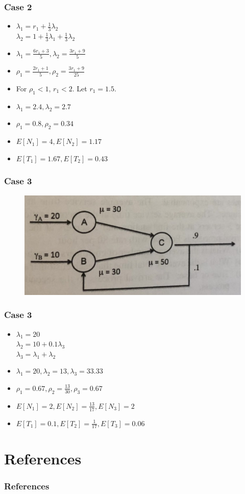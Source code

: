 \documentclass[10pt,notes]{beamer}
\begin{document}
\begin{frame}
    \frametitle{Case 2}
    \begin{itemize}
        \item $\lambda_1 = r_1 + \frac{1}{3}\lambda_2$ \\
            $\lambda_2 = 1 + \frac{1}{3}\lambda_1 + \frac{1}{3}\lambda_2$ \\
        \item $\lambda_1 = \frac{6r_1 + 3}{5}, \lambda_2 = \frac{3r_1 + 9}{5}$
        \item $\rho_1 = \frac{2r_1 + 1}{5}, \rho_2 = \frac{3r_1 + 9}{25}$
        \item For $\rho_1 < 1$, $r_1 < 2$. Let $r_1 = 1.5$.
        \item $\lambda_1 = 2.4, \lambda_2 = 2.7$
        \item $\rho_1 = 0.8, \rho_2 = 0.34$
        \item $E[N_1] = 4, E[N_2] = 1.17$
        \item $E[T_1] = 1.67, E[T_2] = 0.43$
    \end{itemize}
\end{frame}

\begin{frame}
    \frametitle{Case 3}
    \begin{figure}
        \includegraphics[width=0.6\linewidth]{images/case3.jpg}
    \end{figure}
\end{frame}

\begin{frame}
    \frametitle{Case 3}
    \begin{itemize}
        \item $\lambda_1 = 20$ \\
            $\lambda_2 = 10 + 0.1\lambda_3$ \\
            $\lambda_3 = \lambda_1 + \lambda_2$
        \item $\lambda_1 = 20, \lambda_2 = 13, \lambda_3 = 33.33$
        \item $\rho_1 = 0.67, \rho_2 = \frac{13}{30}, \rho_3 = 0.67$
        \item $E[N_1] = 2, E[N_2] = \frac{13}{17}, E[N_3] = 2$
        \item $E[T_1] = 0.1, E[T_2] = \frac{1}{17}, E[T_3] = 0.06$
    \end{itemize}
\end{frame}

\section{References}

\begin{frame}
    \frametitle{References}
    \nocite{*}
    \printbibliography
\end{frame}
\end{document}
